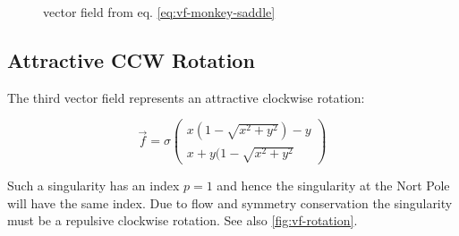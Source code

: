\documentclass[a4paper,10pt,notitlepage]{scrartcl}
\begin{document}
\begin{figure}[H]
  \centering
  \caption{vector field from eq. \ref{eq:vf-monkey-saddle}}
  \label{fig:vf-monkey-saddle}
\end{figure}

\subsection{Attractive CCW Rotation}

The third vector field represents an attractive clockwise rotation:

\begin{equation}
 \vec{f} = \sigma \left( \begin{array}{c}
                   x(1-\sqrt{x^2+y^2}) -y \\ x + y(1-\sqrt{x^2+y^2}
                  \end{array} \right)
 \label{eq:vf-rotation}
\end{equation}

Such a singularity has an index $p = 1$ and hence the singularity at the Nort
Pole will have the same index. Due to flow and symmetry conservation the
singularity must be a repulsive clockwise rotation. See also
\ref{fig:vf-rotation}.
\end{document}
